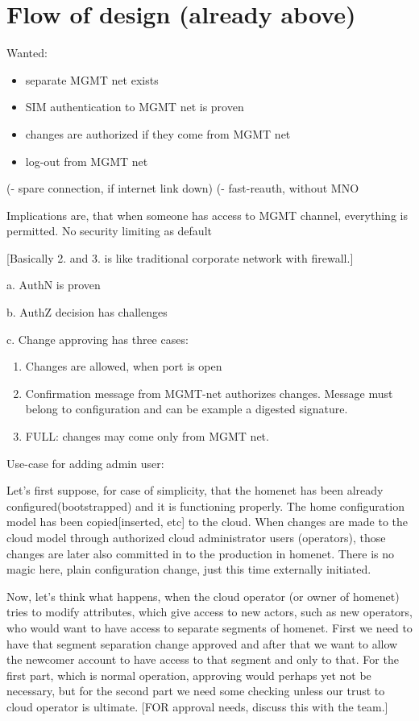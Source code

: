 \documentclass[12pt,a4paper,english]{tutthesis}
\begin{document}
\section{Flow of design (already above)}
\label{sec-4-2}

Wanted: 
\begin{itemize}
\item separate MGMT net exists
\item SIM authentication to MGMT net is proven
\item changes are authorized if they come from MGMT net
\item log-out from MGMT net
\end{itemize}
(- spare connection, if internet link down)
(- fast-reauth, without MNO

Implications are, that when someone has access to MGMT channel,
everything is permitted. No security limiting as default 

[Basically 2. and 3. is like traditional corporate network with firewall.]

a. AuthN is proven

b. AuthZ decision has challenges

c. Change approving has three cases:
\begin{enumerate}
\item Changes are allowed, when port is open
\item Confirmation message from MGMT-net authorizes changes.
Message must belong to configuration and can be example a digested signature.
\item FULL: changes may come only from MGMT net.
\end{enumerate}


Use-case for adding admin user:

Let's first suppose, for case of simplicity, that the homenet has been
already configured(bootstrapped) and it is functioning properly.  The
home configuration model has been copied[inserted, etc] to the cloud.
When changes are made to the cloud model through authorized cloud
administrator users (operators), those changes are later also committed
in to the production in homenet. There is no magic here, plain
configuration change, just this time externally initiated.

Now, let's think what happens, when the cloud operator (or owner of
homenet) tries to modify attributes, which give access to new actors,
such as new operators, who would want to have access to separate
segments of homenet.  First we need to have that segment separation
change approved and after that we want to allow the newcomer account
to have access to that segment and only to that. For the first part,
which is normal operation, approving would perhaps yet not be
necessary, but for the second part we need some checking unless our
trust to cloud operator is ultimate.  [FOR approval needs, discuss
this with the team.]
\end{document}

